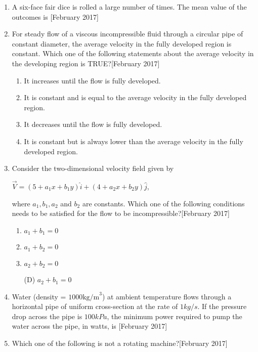 \documentclass[journal]{IEEEtran}
\begin{document}
\begin{enumerate}
\begin{enumerate}
\end{enumerate}
\item A six-face fair dice is rolled a large number of times. The mean value of the outcomes is \underline{\hspace{2cm}}\hfill[February 2017]
\item For steady flow of a viscous incompressible fluid through a circular pipe of constant diameter, the average velocity in the fully developed region is constant. Which one of the following statements about the average velocity in the developing region is TRUE?\hfill[February 2017]
\begin{enumerate}
    \item It increases until the flow is fully developed.
    \item It is constant and is equal to the average velocity in the fully developed region.
    \item It decreases until the flow is fully developed.
    \item It is constant but is always lower than the average velocity in the fully developed region.
\end{enumerate}
\newpage
\item Consider the two-dimensional velocity field given by 
\begin{center}
$\vec{V} = (5 + a_1 x + b_1 y) \hat{i} + (4 + a_2 x + b_2 y) \hat{j}$,
\end{center}where $ a_1, b_1, a_2 $ and  $b_2$ are constants. Which one of the following conditions needs to be satisfied for the flow to be incompressible?\hfill[February 2017]
\begin{enumerate}
    \item $a_1 + b_1 = 0$
    \item $a_1 + b_2 = 0$
    \item $a_2 + b_2 = 0$
    \item[(D)]  $a_2 + b_1 = 0$
\end{enumerate}
\item Water (density = $1000\text{kg/m}^3$) at ambient temperature flows through a horizontal pipe of uniform cross-section at the rate of $1 kg/s$. If the pressure drop across the pipe is $100 kPa$, the minimum power required to pump the water across the pipe, in watts, is\underline{\hspace{2cm}} \hfill[February 2017]
\item Which one of the following is not a rotating machine?\hfill[February 2017]
\begin{enumerate}

\end{enumerate}
\end{enumerate}
\end{document}
